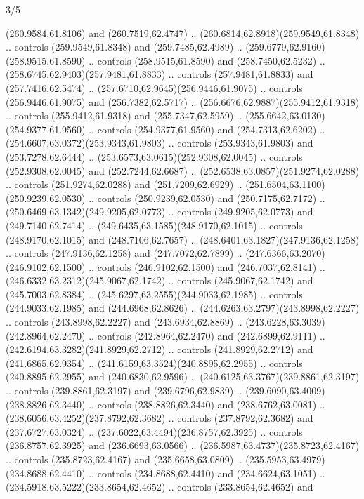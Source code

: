 \begin{flagdescription}{3/5}
\begin{scope}[xshift=0.5\flaglength,yshift=0.5\flagwidth,scale=\flagwidth/99]
\begin{scope}[y=0.8pt, x=0.8pt, yscale=-0.20628, xscale=0.20628,shift={(-500,-300)}]
\begin{scope}[cm={{0.79646,0.0,0.0,0.7753,(100.0721,273.79617)}}]
\begin{scope}[cm={{1.08438,0.0,0.0,1.08438,(-32.32235,-11.27143)}}]
\begin{scope}[cm={{-1.03962,0.13985,0.13985,1.03962,(780.1168,-25.80961)}}]
  (260.9584,61.8106) and (260.7519,62.4747) ..
  (260.6814,62.8918)(259.9549,61.8348) .. controls (259.9549,61.8348) and
  (259.7485,62.4989) .. (259.6779,62.9160)(258.9515,61.8590) .. controls
  (258.9515,61.8590) and (258.7450,62.5232) ..
  (258.6745,62.9403)(257.9481,61.8833) .. controls (257.9481,61.8833) and
  (257.7416,62.5474) .. (257.6710,62.9645)(256.9446,61.9075) .. controls
  (256.9446,61.9075) and (256.7382,62.5717) ..
  (256.6676,62.9887)(255.9412,61.9318) .. controls (255.9412,61.9318) and
  (255.7347,62.5959) .. (255.6642,63.0130)(254.9377,61.9560) .. controls
  (254.9377,61.9560) and (254.7313,62.6202) ..
  (254.6607,63.0372)(253.9343,61.9803) .. controls (253.9343,61.9803) and
  (253.7278,62.6444) .. (253.6573,63.0615)(252.9308,62.0045) .. controls
  (252.9308,62.0045) and (252.7244,62.6687) ..
  (252.6538,63.0857)(251.9274,62.0288) .. controls (251.9274,62.0288) and
  (251.7209,62.6929) .. (251.6504,63.1100)(250.9239,62.0530) .. controls
  (250.9239,62.0530) and (250.7175,62.7172) ..
  (250.6469,63.1342)(249.9205,62.0773) .. controls (249.9205,62.0773) and
  (249.7140,62.7414) .. (249.6435,63.1585)(248.9170,62.1015) .. controls
  (248.9170,62.1015) and (248.7106,62.7657) ..
  (248.6401,63.1827)(247.9136,62.1258) .. controls (247.9136,62.1258) and
  (247.7072,62.7899) .. (247.6366,63.2070)(246.9102,62.1500) .. controls
  (246.9102,62.1500) and (246.7037,62.8141) ..
  (246.6332,63.2312)(245.9067,62.1742) .. controls (245.9067,62.1742) and
  (245.7003,62.8384) .. (245.6297,63.2555)(244.9033,62.1985) .. controls
  (244.9033,62.1985) and (244.6968,62.8626) ..
  (244.6263,63.2797)(243.8998,62.2227) .. controls (243.8998,62.2227) and
  (243.6934,62.8869) .. (243.6228,63.3039)(242.8964,62.2470) .. controls
  (242.8964,62.2470) and (242.6899,62.9111) ..
  (242.6194,63.3282)(241.8929,62.2712) .. controls (241.8929,62.2712) and
  (241.6865,62.9354) .. (241.6159,63.3524)(240.8895,62.2955) .. controls
  (240.8895,62.2955) and (240.6830,62.9596) ..
  (240.6125,63.3767)(239.8861,62.3197) .. controls (239.8861,62.3197) and
  (239.6796,62.9839) .. (239.6090,63.4009)(238.8826,62.3440) .. controls
  (238.8826,62.3440) and (238.6762,63.0081) ..
  (238.6056,63.4252)(237.8792,62.3682) .. controls (237.8792,62.3682) and
  (237.6727,63.0324) .. (237.6022,63.4494)(236.8757,62.3925) .. controls
  (236.8757,62.3925) and (236.6693,63.0566) ..
  (236.5987,63.4737)(235.8723,62.4167) .. controls (235.8723,62.4167) and
  (235.6658,63.0809) .. (235.5953,63.4979)(234.8688,62.4410) .. controls
  (234.8688,62.4410) and (234.6624,63.1051) ..
  (234.5918,63.5222)(233.8654,62.4652) .. controls (233.8654,62.4652) and

\end{scope}
\end{scope}
\end{scope}
\end{scope}
\end{scope}
\end{flagdescription}
